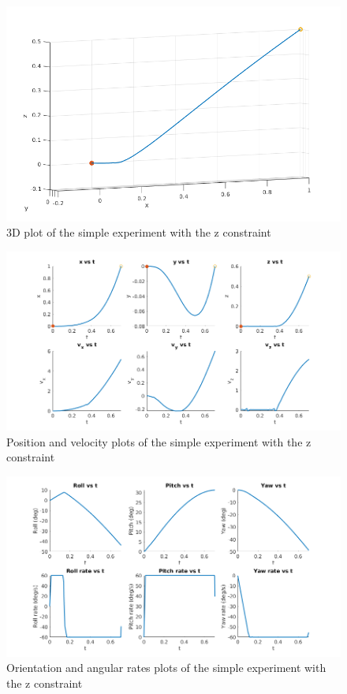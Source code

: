 \documentclass[letterpaper, 10 pt, conference]{ieeeconf}  %
\begin{document}
\begin{figure}[!htpb]
	\centering
	\includegraphics[width=1.0\linewidth]{Images/simple_zconstr/3d.png}
	\caption{3D plot of the simple experiment with the z constraint}
	\label{fig:simple_zconstr_3d}
\end{figure}
\begin{figure}[!htpb]
	\centering
	\includegraphics[width=1.0\linewidth]{Images/simple_zconstr/pos_vel.png}
	\caption{Position and velocity plots of the simple experiment with the z constraint}
	\label{fig:simple_zconstr_pos_vel}
\end{figure}
\begin{figure}[!htpb]
	\centering
	\includegraphics[width=1.0\linewidth]{Images/simple_zconstr/orient_rates.png}
	\caption{Orientation and angular rates plots of the simple experiment with the z constraint}
	\label{fig:simple_zconstr_orient_rates}
\end{figure}
\end{document}
